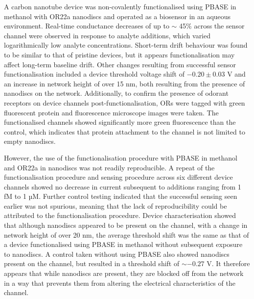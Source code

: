 \documentclass[
  a4paper,
]{scrbook}
\begin{document}
A carbon nanotube device was non-covalently functionalised using PBASE
in methanol with OR22a nanodiscs and operated as a biosensor in an
aqueous environment. Real-time conductance decreases of up to \(\sim\)
45\% across the sensor channel were observed in response to analyte
additions, which varied logarithmically low analyte concentrations.
Short-term drift behaviour was found to be similar to that of pristine
devices, but it appears functionalisation may affect long-term baseline
drift. Other changes resulting from successful sensor functionalisation
included a device threshold voltage shift of \(-0.20 \pm 0.03\) V and an
increase in network height of over 15 nm, both resulting from the
presence of nanodiscs on the network. Additionally, to confirm the
presence of odorant receptors on device channels post-functionalisation,
ORs were tagged with green fluorescent protein and fluorescence
microscope images were taken. The functionalised channels showed
significantly more green fluorescence than the control, which indicates
that protein attachment to the channel is not limited to empty
nanodiscs.

However, the use of the functionalisation procedure with PBASE in
methanol and OR22a in nanodiscs was not readily reproducible. A repeat
of the functionalisation procedure and sensing procedure across six
different device channels showed no decrease in current subsequent to
additions ranging from 1 fM to 1 µM. Further control testing indicated
that the successful sensing seen earlier was not spurious, meaning that
the lack of reproducibility could be attributed to the functionalisation
procedure. Device characterisation showed that although nanodiscs
appeared to be present on the channel, with a change in network height
of over 20 nm, the average threshold shift was the same as that of a
device functionalised using PBASE in methanol without subsequent
exposure to nanodiscs. A control taken without using PBASE also showed
nanodiscs present on the channel, but resulted in a threshold shift of
\(\sim -0.27\) V. It therefore appears that while nanodiscs are present,
they are blocked off from the network in a way that prevents them from
altering the electrical characteristics of the channel.
\end{document}
